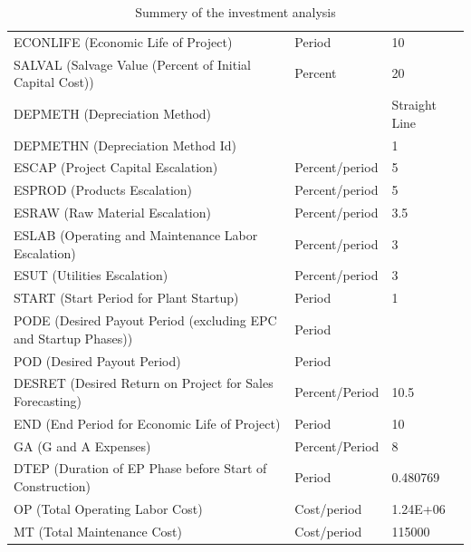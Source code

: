 \begin{enumerate}[label=\textbf{Step \arabic{enumi}}:,ref=Step \arabic{enumi}]
\begin{table}[H]
{\begin{tabular}{l|ll}
			ECONLIFE    (Economic Life of Project)                             & Period         & 10            \\
			SALVAL    (Salvage Value (Percent of Initial Capital Cost))        & Percent        & 20            \\
			DEPMETH    (Depreciation Method)                                   &                & Straight Line \\
			DEPMETHN    (Depreciation Method Id)                               &                & 1             \\
			ESCAP    (Project Capital Escalation)                              & Percent/period & 5             \\
			ESPROD    (Products Escalation)                                    & Percent/period & 5             \\
			ESRAW    (Raw Material Escalation)                                 & Percent/period & 3.5           \\
			ESLAB    (Operating and Maintenance Labor Escalation)              & Percent/period & 3             \\
			ESUT    (Utilities Escalation)                                     & Percent/period & 3             \\
			START    (Start Period for Plant Startup)                          & Period         & 1             \\
			PODE    (Desired Payout Period (excluding EPC and Startup Phases)) & Period         &               \\
			POD    (Desired Payout Period)                                     & Period         &               \\
			DESRET    (Desired Return on Project for Sales Forecasting)        & Percent/Period & 10.5          \\
			END    (End Period for Economic Life of Project)                   & Period         & 10            \\
			GA    (G and A Expenses)                                           & Percent/Period & 8             \\
			DTEP    (Duration of EP Phase before Start of Construction)        & Period         & 0.480769      \\
			OP    (Total Operating Labor Cost)                                 & Cost/period    & 1.24E+06      \\
			MT    (Total Maintenance Cost)                                     & Cost/period    & 115000       \\ \hline
		\end{tabular} }
	\caption{Summery of the investment analysis}
	\label{tab:AceticInvestment}
	\end{table}
		

\end{enumerate}
